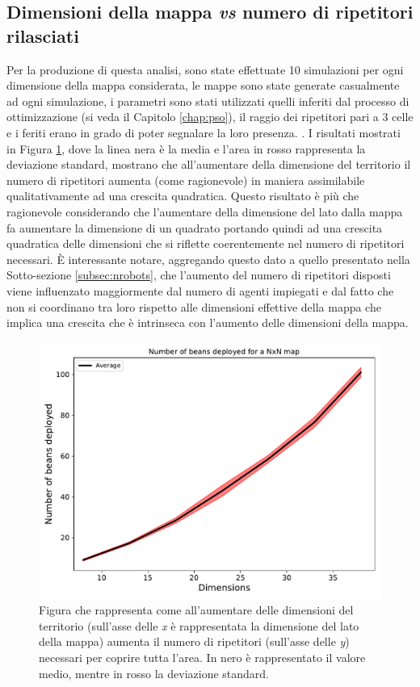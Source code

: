 \subsection{Dimensioni della mappa \textit{vs} numero di ripetitori rilasciati}
Per la produzione di questa analisi, sono state effettuate 10 simulazioni per ogni dimensione della mappa considerata, le mappe sono state generate casualmente ad ogni simulazione, i parametri sono stati utilizzati quelli inferiti dal processo di ottimizzazione (si veda il Capitolo \ref{chap:pso}), il raggio dei ripetitori pari a 3 celle e i feriti erano in grado di poter segnalare la loro presenza. .
I risultati mostrati in Figura \ref{fig:beans}, dove la linea nera è la media e l'area in rosso rappresenta la deviazione standard, mostrano che all'aumentare della dimensione del territorio il numero di ripetitori aumenta (come ragionevole) in maniera assimilabile qualitativamente ad una crescita quadratica.
Questo risultato è più che ragionevole considerando che l'aumentare della dimensione del lato dalla mappa fa aumentare la dimensione di un quadrato portando quindi ad una crescita quadratica delle dimensioni che si riflette coerentemente nel numero di ripetitori necessari.
È interessante notare, aggregando questo dato a quello presentato nella Sotto-sezione \ref{subsec:nrobots}, che l'aumento del numero di ripetitori disposti viene influenzato maggiormente dal numero di agenti impiegati e dal fatto che non si coordinano tra loro rispetto alle dimensioni effettive della mappa che implica una crescita che è intrinseca con l'aumento delle dimensioni della mappa.
\begin{figure}
	\centering
	\includegraphics[width=0.9\linewidth]{images/macro_results/beans}
	\caption{Figura che rappresenta come all'aumentare delle dimensioni del territorio (sull'asse delle \textit{x} è rappresentata la dimensione del lato della mappa) aumenta il numero di ripetitori (sull'asse delle \textit{y}) necessari per coprire tutta l'area. In nero è rappresentato il valore medio, mentre in rosso la deviazione standard.}
	\label{fig:beans}
\end{figure}

